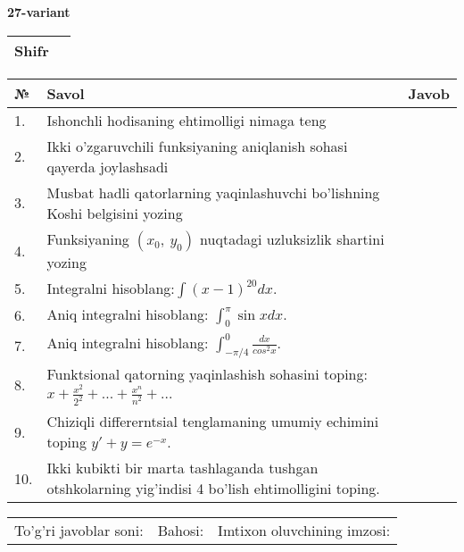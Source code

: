 \documentclass{article}
\begin{document}
  \egroup
  
  \newpage
  
  
  \textbf{27-variant}\\
  
  \bgroup
  \def\arraystretch{1.6} %
  
  \begin{tabular}{|m{5.7cm}|m{9.5cm}|}
  \hline
  Shifr & \\
  \hline
  \end{tabular}
  
  \vspace{1cm}
  
  \begin{tabular}{|m{0.7cm}|m{10cm}|m{4cm}|}
  \hline
  № & Savol & Javob \\
  \hline
  1. & Ishonchli hodisaning ehtimolligi nimaga teng &  \\
  \hline
  2. & Ikki o'zgaruvchili funksiyaning aniqlanish sohasi qayerda joylashsadi &  \\
  \hline
  3. & Musbat hadli qatorlarning yaqinlashuvchi bo'lishning Koshi belgisini yozing &  \\
  \hline
  4. & Funksiyaning \((x_{0},\ y_{0})\) nuqtadagi uzluksizlik shartini yozing &  \\
  \hline
  5. & Integralni hisoblang:\(\int {(x - 1)^{20}}dx\). &  \\
  \hline
  6. & Aniq integralni hisoblang: \(\int_{0}^{\pi}{\sin xdx}\). &  \\
  \hline
  7. & Aniq integralni hisoblang: \(\int_{- \pi/4}^{0}\frac{dx}{cos^{2}x}\). &  \\
  \hline
  8. & Funktsional qatorning yaqinlashish sohasini toping: \(x + \frac{x^{2}}{2^{2}} + ... + \frac{x^{n}}{n^{2}} + ...\) &  \\
  \hline
  9. & Chiziqli differerntsial tenglamaning umumiy echimini toping \(y' + y = e^{- x}\). &  \\
  \hline
  10. & Ikki kubikti bir marta tashlaganda tushgan otshkolarning yig'indisi 4 bo'lish ehtimolligini toping. &  \\
  \hline
  \end{tabular}
  
  \vspace{1cm}
  
  \begin{tabular}{lll}
  To'g'ri javoblar soni: \underline{\hspace{1.5cm}} & 
  Bahosi: \underline{\hspace{1.5cm}} & 
  Imtixon oluvchining imzosi: \underline{\hspace{2cm}} \\
  \end{tabular}
  
\end{document}
